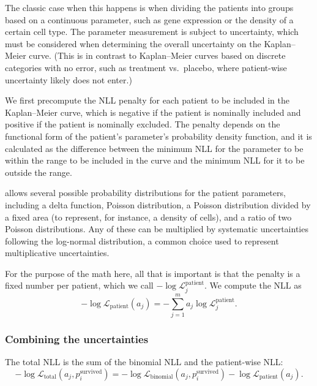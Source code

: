 \documentclass[article]{jss}
\newcommand{\KM}{Kaplan--Meier} %
\begin{document}
The classic case when this happens is when dividing the patients into groups based on a continuous parameter, such as gene expression or the density of a certain cell type.  The parameter measurement is subject to uncertainty, which must be considered when determining the overall uncertainty on the \KM{} curve.  (This is in contrast to \KM{} curves based on discrete categories with no error, such as treatment vs.\ placebo, where patient-wise uncertainty likely does not enter.)

We first precompute the NLL penalty for each patient to be included in the \KM{} curve, which is negative if the patient is nominally included and positive if the patient is nominally excluded.  The penalty depends on the functional form of the patient's parameter's probability density function, and it is calculated as the difference between the minimum NLL for the parameter to be within the range to be included in the curve and the minimum NLL for it to be outside the range.

 allows several possible probability distributions for the patient parameters, including a delta function, Poisson distribution, a Poisson distribution divided by a fixed area (to represent, for instance, a density of cells), and a ratio of two Poisson distributions.  Any of these can be multiplied by systematic uncertainties following the log-normal distribution, a common choice used to represent multiplicative uncertainties.

For the purpose of the math here, all that is important is that the penalty is a fixed number per patient, which we call \(-\log \mathcal{L}_j^{\text{patient}}\).  We compute the NLL as
\begin{equation}
-\log \mathcal{L}_{\text{patient}}(a_j) = -\sum_{j=1}^{m} a_j\log \mathcal{L}_j^{\text{patient}}. \label{eq:patient-nll}
\end{equation}

\subsubsection{Combining the uncertainties}\label{sec:combining-uncertainties}

The total NLL is the sum of the binomial NLL and the patient-wise NLL\@:
\begin{equation}
-\log \mathcal{L}_{\text{total}}(a_j, p_i^\text{survived}) = -\log \mathcal{L}_{\text{binomial}}(a_j, p_i^\text{survived}) - \log \mathcal{L}_{\text{patient}}(a_j). \label{eq:total-nll}
\end{equation}
\end{document}
